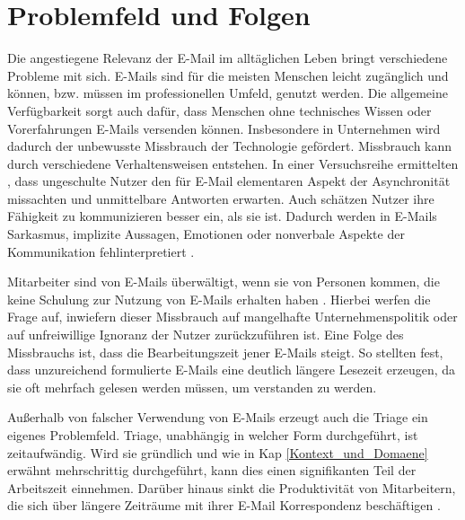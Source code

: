 \newpage


\section{Problemfeld und Folgen}
\label{Problemfeld_und_Folgen}

Die angestiegene Relevanz der E-Mail im alltäglichen Leben bringt verschiedene Probleme mit sich. E-Mails sind für die meisten Menschen leicht zugänglich und können, bzw. müssen im professionellen Umfeld, genutzt werden. Die allgemeine Verfügbarkeit sorgt auch dafür, dass Menschen ohne technisches Wissen oder Vorerfahrungen E-Mails versenden können. Insbesondere in Unternehmen wird dadurch der unbewusste Missbrauch der Technologie gefördert. Missbrauch kann durch verschiedene Verhaltensweisen entstehen. In einer Versuchsreihe ermittelten \cite[S. 267]{Thomas2006}, dass ungeschulte Nutzer den für E-Mail elementaren Aspekt der Asynchronität missachten und unmittelbare Antworten erwarten. Auch schätzen Nutzer ihre Fähigkeit zu kommunizieren besser ein, als sie ist. Dadurch werden in E-Mails Sarkasmus, implizite Aussagen, Emotionen oder nonverbale Aspekte der Kommunikation fehlinterpretiert \citep[S. 933]{Kruger2005}.

Mitarbeiter sind von E-Mails überwältigt, wenn sie von Personen kommen, die keine Schulung zur Nutzung von E-Mails erhalten haben \citep[S. 179, 194]{Dawley2003}. Hierbei werfen \cite[S. 77]{Lagrana2016} die Frage auf, inwiefern dieser Missbrauch auf mangelhafte Unternehmenspolitik oder auf unfreiwillige Ignoranz der Nutzer zurückzuführen ist. Eine Folge des Missbrauchs ist, dass die Bearbeitungszeit jener E-Mails steigt. So stellten \cite[S. 1331 f.]{Friedman2003} fest, dass unzureichend formulierte E-Mails eine deutlich längere Lesezeit erzeugen, da sie oft mehrfach gelesen werden müssen, um verstanden zu werden.

Außerhalb von falscher Verwendung von E-Mails erzeugt auch die Triage ein eigenes Problemfeld. Triage, unabhängig in welcher Form durchgeführt, ist zeitaufwändig. Wird sie gründlich und wie in Kap \ref{Kontext_und_Domaene} erwähnt mehrschrittig durchgeführt, kann dies einen signifikanten Teil der Arbeitszeit einnehmen. Darüber hinaus sinkt die Produktivität von Mitarbeitern, die sich über längere Zeiträume mit ihrer E-Mail Korrespondenz beschäftigen \citep[S. 1723 f.]{Mark2016}.

